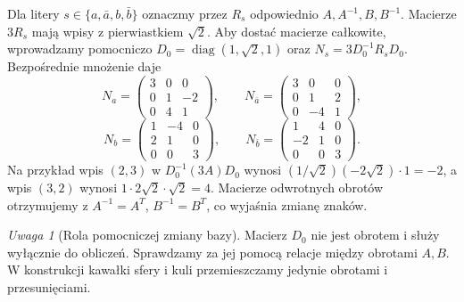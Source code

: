 \documentclass[11pt,a4paper]{article}
\numberwithin{equation}{section}
\theoremstyle{plain}
\theoremstyle{definition}
\theoremstyle{remark}
\newtheorem{uwaga}[twierdzenie]{Uwaga}
\begin{document}
Dla litery $s\in\{a,\bar a,b,\bar b\}$ oznaczmy przez $R_s$ odpowiednio $A,A^{-1},B,B^{-1}$. Macierze $3R_s$ mają wpisy z pierwiastkiem $\sqrt2$. Aby dostać macierze całkowite, wprowadzamy pomocniczo $D_0=\operatorname{diag}(1,\sqrt2,1)$ oraz $N_s=3D_0^{-1}R_sD_0$. Bezpośrednie mnożenie daje
\begin{equation}\label{eq:5-2}
 N_a=\begin{pmatrix}3&0&0\\0&1&-2\\0&4&1\end{pmatrix},\qquad
 N_{\bar a}=\begin{pmatrix}3&0&0\\0&1&2\\0&-4&1\end{pmatrix},
\end{equation}
\begin{equation}\label{eq:5-3}
 N_b=\begin{pmatrix}1&-4&0\\2&1&0\\0&0&3\end{pmatrix},\qquad
 N_{\bar b}=\begin{pmatrix}1&4&0\\-2&1&0\\0&0&3\end{pmatrix}.
\end{equation}
Na przykład wpis $(2,3)$ w $D_0^{-1}(3A)D_0$ wynosi $(1/\sqrt2)(-2\sqrt2)\cdot1=-2$, a wpis $(3,2)$ wynosi $1\cdot2\sqrt2\cdot\sqrt2=4$. Macierze odwrotnych obrotów otrzymujemy z $A^{-1}=A^T$, $B^{-1}=B^T$, co wyjaśnia zmianę znaków.
\begin{uwaga}[Rola pomocniczej zmiany bazy]
Macierz $D_0$ nie jest obrotem i służy wyłącznie do obliczeń. Sprawdzamy za jej pomocą relacje między obrotami $A,B$. W konstrukcji kawałki sfery i kuli przemieszczamy jedynie obrotami i przesunięciami.
\end{uwaga}
\end{document}
